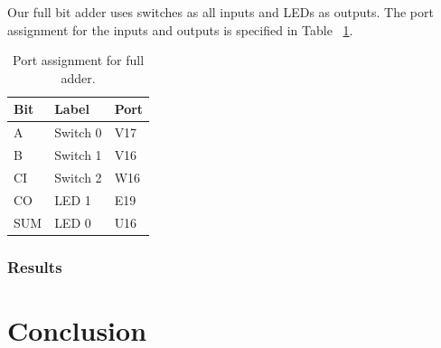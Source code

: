 \documentclass[11pt]{article}
\begin{document}
Our full bit adder uses switches as all inputs and LEDs as outputs. The port assignment for the inputs and outputs is specified in Table ~\ref{tab:fullAddPorts}.

\begin{table}[h]
\begin{center}
	\begin{tabular}{| l | l | l |}
		\hline
		Bit & Label & Port \\ \hline
		A & Switch 0 & V17 \\ \hline
		B & Switch 1 & V16 \\ \hline
		CI & Switch 2 & W16 \\ \hline
		CO & LED 1 & E19 \\ \hline
		SUM & LED 0 & U16 \\ \hline
	\end{tabular}
	\caption{\label{tab:fullAddPorts}Port assignment for full adder.}
	\label{tab:fullAddPorts}
\end{center}	
\end{table}

\subsubsection{Results}

\section{Conclusion}
\end{document}
